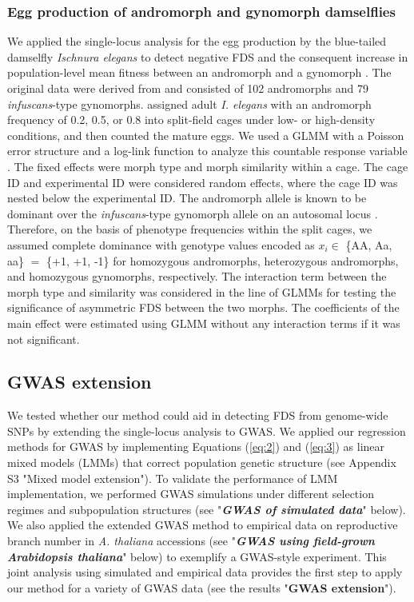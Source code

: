 \documentclass[12pt,]{article}
\begin{document}
\subsubsection{Egg production of andromorph and gynomorph damselflies}
We applied the single-locus analysis for the egg production by the blue-tailed damselfly \textit{Ischnura elegans} to detect negative FDS and the consequent increase in population-level mean fitness between an andromorph and a gynomorph \citep{takahashi2014evolution}. The original data were derived from \cite{takahashi2014evolution} and consisted of 102 andromorphs and 79 \textit{infuscans}-type gynomorphs. \cite{takahashi2014evolution} assigned adult \textit{I. elegans} with an andromorph frequency of 0.2, 0.5, or 0.8 into split-field cages under low- or high-density conditions, and then counted the mature eggs. We used a GLMM with a Poisson error structure and a log-link function to analyze this countable response variable \cite{takahashi2014evolution}. The fixed effects were morph type and morph similarity within a cage. The cage ID and experimental ID were considered random effects, where the cage ID was nested below the experimental ID. The andromorph allele is known to be dominant over the \textit{infuscans}-type gynomorph allele on an autosomal locus \citep{sanchez2005hybridization}. Therefore, on the basis of phenotype frequencies within the split cages, we assumed complete dominance with genotype values encoded as $x_i \in$ \{AA, Aa, aa\} $=$ \{+1, +1, -1\} for homozygous andromorphs, heterozygous andromorphs, and homozygous gynomorphs, respectively. The interaction term between the morph type and similarity was considered in the line of GLMMs for testing the significance of asymmetric FDS between the two morphs. The coefficients of the main effect were estimated using GLMM without any interaction terms if it was not significant.

\subsection{GWAS extension}
We tested whether our method could aid in detecting FDS from genome-wide SNPs by extending the single-locus analysis to GWAS. We applied our regression methods for GWAS by implementing Equations (\ref{eq:2}) and (\ref{eq:3}) as linear mixed models (LMMs) that correct population genetic structure (see Appendix S3 "Mixed model extension"). To validate the performance of LMM implementation, we performed GWAS simulations under different selection regimes and subpopulation structures (see "\textit{\textbf{GWAS of simulated data}}" below). We also applied the extended GWAS method to empirical data on reproductive branch number in \textit{A. thaliana} accessions (see "\textit{\textbf{GWAS using field-grown Arabidopsis thaliana}}" below) to exemplify a GWAS-style experiment. This joint analysis using simulated and empirical data provides the first step to apply our method for a variety of GWAS data (see the results "\textbf{GWAS extension}").
\end{document}
